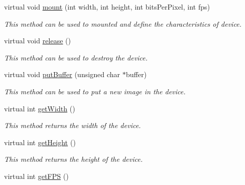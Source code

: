 \begin{DoxyCompactItemize}
\item 
virtual void \hyperlink{classbr_1_1ufscar_1_1lince_1_1xpta_1_1streaming_1_1DeviceInterface_a0fdba459c2b103e4b301702b978248b5}{mount} (int width, int height, int bitsPerPixel, int fps)
\begin{DoxyCompactList}\small\item\em This method can be used to mounted and define the characteristics of device. \item\end{DoxyCompactList}\item 
virtual void \hyperlink{classbr_1_1ufscar_1_1lince_1_1xpta_1_1streaming_1_1DeviceInterface_a0e4247104e6f69efd841f4e081adb2b8}{release} ()
\begin{DoxyCompactList}\small\item\em This method can be used to destroy the device. \item\end{DoxyCompactList}\item 
virtual void \hyperlink{classbr_1_1ufscar_1_1lince_1_1xpta_1_1streaming_1_1DeviceInterface_af0046c56cb9799f13fe25ae869934ba2}{putBuffer} (unsigned char $\ast$buffer)
\begin{DoxyCompactList}\small\item\em This method can be used to put a new image in the device. \item\end{DoxyCompactList}\item 
virtual int \hyperlink{classbr_1_1ufscar_1_1lince_1_1xpta_1_1streaming_1_1DeviceInterface_ac0604d57e99494950d7e7bb7f2dc8f51}{getWidth} ()
\begin{DoxyCompactList}\small\item\em This method returns the width of the device. \item\end{DoxyCompactList}\item 
virtual int \hyperlink{classbr_1_1ufscar_1_1lince_1_1xpta_1_1streaming_1_1DeviceInterface_a924cf429c4bb03aed22701e0e331d50d}{getHeight} ()
\begin{DoxyCompactList}\small\item\em This method returns the height of the device. \item\end{DoxyCompactList}\item 
virtual int \hyperlink{classbr_1_1ufscar_1_1lince_1_1xpta_1_1streaming_1_1DeviceInterface_a5693a8dba7af4ddb3329f4f301ef83b3}{getFPS} ()

\end{DoxyCompactItemize}
